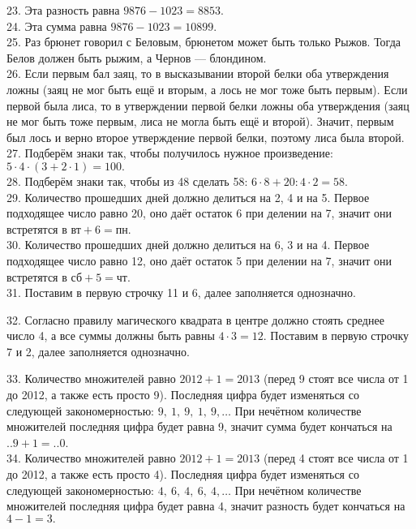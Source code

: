 23. Эта разность равна $9876-1023=8853.$\\
24. Эта сумма равна $9876-1023=10899.$\\
25. Раз брюнет говорил с Беловым, брюнетом может быть только Рыжов. Тогда Белов должен быть рыжим, а Чернов --- блондином.\\
26. Если первым бал заяц, то в высказывании второй белки оба утверждения ложны (заяц не мог быть ещё и вторым, а лось не мог тоже быть первым). Если первой была лиса, то в утверждении первой белки ложны оба утверждения (заяц не мог быть тоже первым, лиса не могла быть ещё и второй). Значит, первым был лось и верно второе утверждение первой белки, поэтому лиса была второй.\\
27. Подберём знаки так, чтобы получилось нужное произведение: $5\cdot4\cdot(3+2\cdot1) = 100.$\\
28. Подберём знаки так, чтобы из 48 сделать 58: $6\cdot8+20:4\cdot2 = 58.$\\
29. Количество прошедших дней должно делиться на 2, 4 и на 5. Первое подходящее число равно 20, оно даёт остаток 6 при делении на 7, значит они встретятся в $\text{вт}+6=\text{пн}$.\\
30. Количество прошедших дней должно делиться на 6, 3 и на 4. Первое подходящее число равно 12, оно даёт остаток 5 при делении на 7, значит они встретятся в $\text{сб}+5=\text{чт}$.\\
31. Поставим в первую строчку 11 и 6, далее заполняется однозначно.
\begin{center}
\begin{figure}[ht!]
\end{figure}
\end{center}
32. Согласно правилу магического квадрата в центре должно стоять среднее число 4, а все суммы должны быть равны $4\cdot3=12.$ Поставим в первую строчку 7 и 2, далее заполняется однозначно.
\begin{center}
\begin{figure}[ht!]
\end{figure}
\end{center}
33. Количество множителей равно $2012+1=2013$ (перед 9 стоят все числа от 1 до 2012, а также есть просто 9). Последняя цифра будет изменяться со следующей закономерностью: $9,\ 1,\ 9,\ 1,\ 9,\ldots$ При нечётном количестве множителей последняя цифра будет равна 9, значит сумма будет кончаться на $..9+1=..0$.\\
34. Количество множителей равно $2012+1=2013$ (перед 4 стоят все числа от 1 до 2012, а также есть просто 4). Последняя цифра будет изменяться со следующей закономерностью: $4,\ 6,\ 4,\ 6,\ 4,\ldots$ При нечётном количестве множителей последняя цифра будет равна 4, значит разность будет кончаться на $4-1=3.$\\
